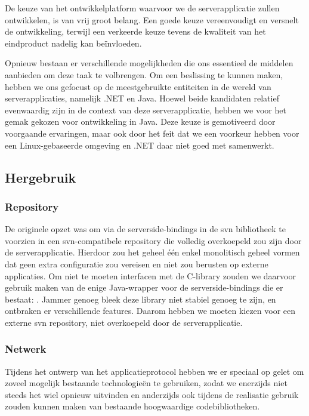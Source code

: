 De keuze van het ontwikkelplatform waarvoor we de serverapplicatie zullen ontwikkelen, is van vrij groot belang. Een goede keuze vereenvoudigt en versnelt de ontwikkeling, terwijl een verkeerde keuze tevens de kwaliteit van het eindproduct nadelig kan beïnvloeden.

Opnieuw bestaan er verschillende mogelijkheden die ons essentieel de middelen aanbieden om deze taak te volbrengen. Om een beslissing te kunnen maken, hebben we ons gefocust op de meestgebruikte entiteiten in de wereld van serverapplicaties, namelijk .NET en Java. Hoewel beide kandidaten relatief evenwaardig zijn in de context van deze serverapplicatie, hebben we voor het gemak gekozen voor ontwikkeling in Java. Deze keuze is gemotiveerd door voorgaande ervaringen, maar ook door het feit dat we een voorkeur hebben voor een Linux-gebaseerde omgeving en .NET daar niet goed met samenwerkt.

\subsection{Hergebruik}

\subsubsection{Repository}

De originele opzet was om via de serverside-bindings in de \ac{svn} bibliotheek te voorzien in een \ac{svn}-compatibele repository die volledig overkoepeld zou zijn door de serverapplicatie. Hierdoor zou het geheel één enkel monolitisch geheel vormen dat geen extra configuratie zou vereisen en niet zou berusten op externe applicaties. Om niet te moeten interfacen met de C-library zouden we daarvoor gebruik maken van de enige Java-wrapper voor de serverside-bindings die er bestaat: . Jammer genoeg bleek deze library niet stabiel genoeg te zijn, en ontbraken er verschillende features. Daarom hebben we moeten kiezen voor een externe \ac{svn} repository, niet overkoepeld door de serverapplicatie.

\subsubsection{Netwerk}

Tijdens het ontwerp van het applicatieprotocol hebben we er speciaal op gelet om zoveel mogelijk bestaande technologieën te gebruiken, zodat we enerzijds niet steeds het wiel opnieuw uitvinden en anderzijds ook tijdens de realisatie gebruik zouden kunnen maken van bestaande hoogwaardige codebibliotheken.

